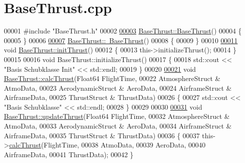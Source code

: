 \hypertarget{_base_thrust_8cpp_source}{}\section{Base\+Thrust.\+cpp}
\label{_base_thrust_8cpp_source}

\begin{DoxyCode}
00001 \textcolor{preprocessor}{#include "BaseThrust.h"}
00002 
\hyperlink{group___engine_a19885a6a70bfc4c02e2d8f310af9f22e}{00003} \hyperlink{group___engine_a19885a6a70bfc4c02e2d8f310af9f22e}{BaseThrust::BaseThrust}()
00004 \{
00005 \}
00006 
\hyperlink{group___engine_a554955351c2acfe7a46c00fe056c5c6c}{00007} \hyperlink{group___engine_a554955351c2acfe7a46c00fe056c5c6c}{BaseThrust::~BaseThrust}()
00008 \{
00009 \}
00010 
\hyperlink{group___engine_a1a9a88e6c05cc0b2564522347365900c}{00011} \textcolor{keywordtype}{void} \hyperlink{group___engine_a1a9a88e6c05cc0b2564522347365900c}{BaseThrust::initThrust}()
00012 \{
00013     this->initializeThrust();
00014 \}
00015 
00016 \textcolor{keywordtype}{void} BaseThrust::initializeThrust()
00017 \{
00018     std::cout << \textcolor{stringliteral}{"Basis Schubklasse Init"} << std::endl;
00019 \}
00020 
\hyperlink{group___engine_ac578e683598739655ce52ea85d97362b}{00021} \textcolor{keywordtype}{void} \hyperlink{group___engine_ac578e683598739655ce52ea85d97362b}{BaseThrust::calcThrust}(Float64 FlightTime,
00022                             AtmosphereStruct & AtmoData,
00023                             AerodynamicStruct & AeroData,
00024                             AirframeStruct & AirframeData,
00025                             ThrustStruct & ThrustData)
00026 \{
00027     std::cout << \textcolor{stringliteral}{"Basis Schubklasse"} << std::endl;
00028 \}
00029 
00030 
\hyperlink{group___engine_a869359a1b2b7cddcbe5979d6a1cf5eac}{00031} \textcolor{keywordtype}{void} \hyperlink{group___engine_a869359a1b2b7cddcbe5979d6a1cf5eac}{BaseThrust::updateThrust}(Float64 FlightTime,
00032                             AtmosphereStruct & AtmoData,
00033                             AerodynamicStruct & AeroData,
00034                             AirframeStruct & AirframeData,
00035                             ThrustStruct & ThrustData)
00036 \{
00037     this->\hyperlink{group___engine_ac578e683598739655ce52ea85d97362b}{calcThrust}(FlightTime,
00038                     AtmoData,
00039                     AeroData,
00040                     AirframeData,
00041                     ThrustData);
00042 \}
\end{DoxyCode}
